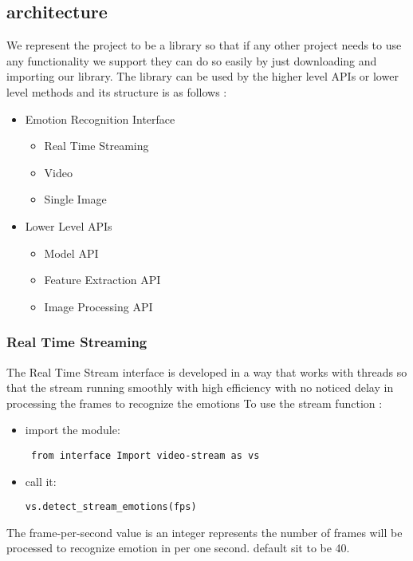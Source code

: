 \subsection{architecture}
    We represent the project to be a library so that if any other project needs to use any functionality we support they can do so easily by just downloading and importing our library.
\bigbreak
    The library can be used by the higher level APIs or 
    lower level methods and its structure is as follows :
        \begin{itemize}
             \item Emotion Recognition Interface 
                \begin{itemize}
                    \item Real Time Streaming
                    \item Video
                    \item Single Image
                \end{itemize}
             \item Lower Level APIs
                \begin{itemize}
                    \item Model API
                    \item Feature Extraction API
                    \item Image Processing API
                \end{itemize}
        \end{itemize}

\subsubsection{Real Time Streaming}
The Real Time Stream interface is developed in a way that works with threads so that the stream running smoothly with high efficiency with no noticed delay in processing the frames to recognize the emotions 
\bigbreak 
\noindent To use the stream function :
\begin{itemize}
\item import the module:
\begin{verbatim}
 from interface Import video-stream as vs
\end{verbatim}
\item call it:
\begin{verbatim}
vs.detect_stream_emotions(fps)
\end{verbatim}
\end{itemize}
The frame-per-second value is an integer represents the number of frames will be processed to recognize emotion in per one second. default sit to be 40.
\bigbreak

